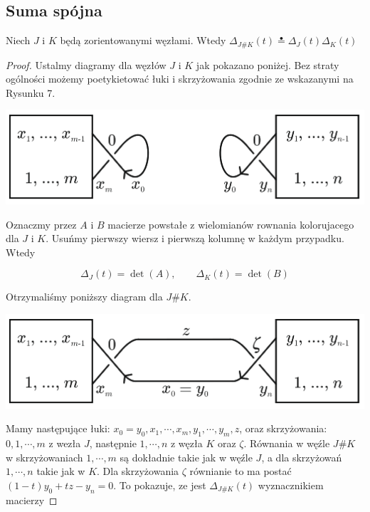 

\subsection{Suma spójna}

\begin{twierdzenie}
   Niech $J$ i $K$ będą zorientowanymi węzłami. Wtedy $\Delta_{J\#K}(t) \stackrel{\bullet}{=} \Delta_J(t) \Delta_K(t)$
\end{twierdzenie}

\begin{proof}
   Ustalmy diagramy dla węzłów $J$ i $K$ jak pokazano poniżej. Bez straty ogólności możemy poetykietować łuki i skrzyżowania zgodnie ze wskazanymi na Rysunku 7.

   \begin{center}
   \includegraphics[scale=0.5]{3/images/7}
   \end{center}
   
   Oznaczmy przez $A$ i $B$ macierze powstałe z wielomianów rownania kolorujacego dla $J$ i $K$. Usuńmy pierwszy wiersz i pierwszą kolumnę w każdym przypadku. Wtedy
   
   $$
   \Delta_J(t) = \det(A), \qquad 
   \Delta_K(t) = \det(B)
   $$
   
   Otrzymaliśmy poniższy diagram dla $J\#K$.
     
   \begin{center}
   \includegraphics[scale=0.5]{3/images/8}
   \end{center}

   Mamy następujące łuki: $x_0 = y_0, x_1, \cdots, x_m, y_1, \cdots, y_m, z$, oraz skrzyżowania: $0, 1, \cdots, m$ z wezła $J$, następnie $1, \cdots, n$ z węzła $K$ oraz $\zeta$.
   Równania w węźle $J\#K$ w skrzyżowaniach $1, \cdots, m$ są dokładnie takie jak w węźle $J$, a dla skrzyżowań $1, \cdots , n$ takie jak w $K$. Dla skrzyżowania
   $\zeta$ równianie to ma postać $(1-t)y_0 + tz - y_n = 0$. 
   To pokazuje, ze jest $\Delta_{J\#K}(t)$ wyznacznikiem macierzy
   

\end{proof}
